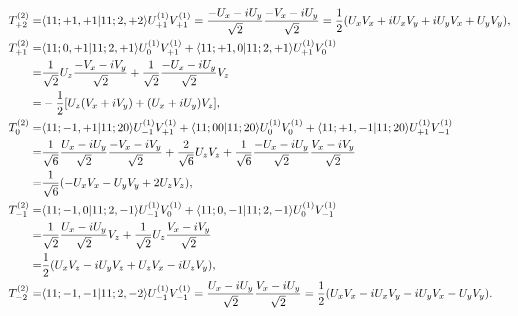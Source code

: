 \documentclass{assignment}
\begin{document}
\begin{sol}
\begin{itemize}
        \begin{align}
            T_{+2}^{(2)}=&\langle 11;+1,+1\vert 11;2,+2\rangle U_{+1}^{(1)}V_{+1}^{(1)}=\frac{-U_x-iU_y}{\sqrt{2}}\frac{-V_x-iU_y}{\sqrt{2}}=\frac{1}{2}(U_xV_x+iU_xV_y+iU_yV_x+U_yV_y),\\
            \notag T_{+1}^{(2)}=&\langle 11;0,+1\vert 11;2,+1\rangle U_{0}^{(1)}V_{+1}^{(1)}+\langle 11;+1,0\vert 11;2,+1\rangle U_{+1}^{(1)}V_{0}^{(1)}\\
            \notag=&\frac{1}{\sqrt{2}}U_z\frac{-V_x-iV_y}{\sqrt{2}}+\frac{1}{\sqrt{2}}\frac{-U_x-iU_y}{\sqrt{2}}V_z\\
            =&-\frac{1}{2}[U_z(V_x+iV_y)+(U_x+iU_y)V_z],\\
            \notag T_{0}^{(2)}=&\langle 11;-1,+1\vert 11;20\rangle U_{-1}^{(1)}V_{+1}^{(1)}+\langle 11;00\vert 11;20\rangle U_{0}^{(1)}V_{0}^{(1)}+\langle 11;+1,-1\vert 11;20\rangle U_{+1}^{(1)}V_{-1}^{(1)}\\
            \notag=&\frac{1}{\sqrt{6}}\frac{U_x-iU_y}{\sqrt{2}}\frac{-V_x-iV_y}{\sqrt{2}}+\frac{2}{\sqrt{6}}U_zV_z+\frac{1}{\sqrt{6}}\frac{-U_x-iU_y}{\sqrt{2}}\frac{V_x-iV_y}{\sqrt{2}}\\
            =&\frac{1}{\sqrt{6}}(-U_xV_x-U_yV_y+2U_zV_z),\\
            \notag T_{-1}^{(2)}=&\langle 11;-1,0\vert 11;2,-1\rangle U_{-1}^{(1)}V_{0}^{(1)}+\langle 11;0,-1\vert 11;2,-1\rangle U_{0}^{(1)}V_{-1}^{(1)}\\
            \notag=&\frac{1}{\sqrt{2}}\frac{U_x-iU_y}{\sqrt{2}}V_z+\frac{1}{\sqrt{2}}U_z\frac{V_x-iV_y}{\sqrt{2}}\\
            =&\frac{1}{2}(U_xV_z-iU_yV_z+U_zV_x-iU_zV_y),\\
            \notag T_{-2}^{(2)}=&\langle 11;-1,-1\vert 11;2,-2\rangle U_{-1}^{(1)}V_{-1}^{(1)}=\frac{U_x-iU_y}{\sqrt{2}}\frac{V_x-iU_y}{\sqrt{2}}=\frac{1}{2}(U_xV_x-iU_xV_y-iU_yV_x-U_yV_y).
        \end{align}
    \end{itemize}
\end{sol}
\end{document}
